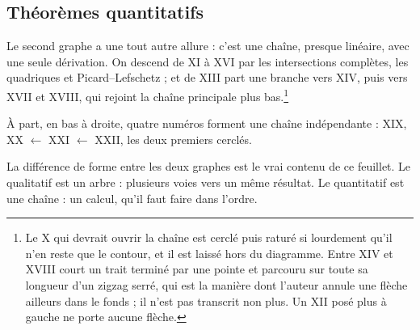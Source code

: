 \documentclass[11pt,a4paper]{article}
\begin{document}
\subsection*{Théorèmes quantitatifs}


Le second graphe a une tout autre allure : c'est une chaîne, presque linéaire,
avec une seule dérivation. On descend de XI à XVI par les intersections
complètes, les quadriques et Picard--Lefschetz ; et de XIII part une branche
vers XIV, puis vers XVII et XVIII, qui rejoint la chaîne principale plus
bas.\footnote{Le X qui devrait ouvrir la chaîne est cerclé puis raturé si
lourdement qu'il n'en reste que le contour, et il est laissé hors du diagramme.
Entre XIV et XVIII court un trait terminé par une pointe et parcouru sur toute
sa longueur d'un zigzag serré, qui est la manière dont l'auteur annule une
flèche ailleurs dans le fonds ; il n'est pas transcrit non plus. Un XII posé
plus à gauche ne porte aucune flèche.}

À part, en bas à droite, quatre numéros forment une chaîne indépendante :
XIX, XX $\leftarrow$ XXI $\leftarrow$ XXII, les deux premiers cerclés.

La différence de forme entre les deux graphes est le vrai contenu de ce
feuillet. Le qualitatif est un arbre : plusieurs voies vers un même résultat. Le
quantitatif est une chaîne : un calcul, qu'il faut faire dans l'ordre.
\end{document}
